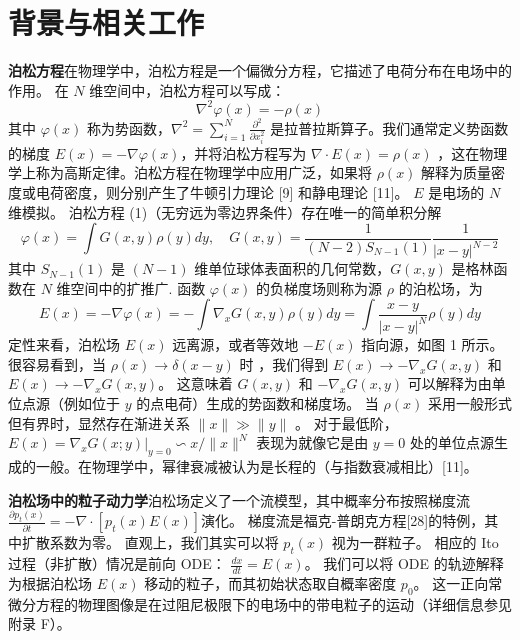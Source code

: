 \documentclass[hyperref,UTF-8]{ctexart}
\newcommand{\0}{\boldsymbol{0}}
\begin{document}
\section{背景与相关工作}

\textbf{泊松方程}\quad 在物理学中，泊松方程是一个偏微分方程，它描述了电荷分布在电场中的作用。 在 $N$ 维空间中，泊松方程可以写成：
\begin{equation}
    \nabla^2 \varphi(x) = -\rho (x)
\end{equation}
其中 $\varphi(x)$ 称为势函数，$\nabla^2  =\displaystyle \sum _{i=1}^N \frac{\partial ^2 }{\partial x_i ^2}$ 是拉普拉斯算子。我们通常定义势函数的梯度 $E(x) = -\nabla \varphi(x)$，并将泊松方程写为 $\nabla \cdot E(x) = \rho(x)$ ，这在物理学上称为高斯定律。泊松方程在物理学中应用广泛，如果将 $\rho(x)$ 解释为质量密度或电荷密度，则分别产生了牛顿引力理论 [9] 和静电理论 [11]。 $E$ 是电场的 $N$ 维模拟。 泊松方程 (1)（无穷远为零边界条件）存在唯一的简单积分解
\begin{equation}
    \varphi(x) = \int G(x,y)\rho(y) dy,\quad G(x,y) = \frac{1}{(N-2)S_{N-1}(1)} \frac{1}{|x-y|^{N-2}}
\end{equation}
其中 $S_{N-1}(1)$ 是 $(N - 1)$ 维单位球体表面积的几何常数，$G(x,y)$ 是格林函数在 $N$ 维空间中的扩推广. 函数 $\varphi(x)$ 的负梯度场则称为源 $\rho$ 的泊松场，为
\begin{equation}
    E(x) = -\nabla \varphi(x) = -\int \nabla_x G(x,y)\rho(y) dy = \int \frac{x-y}{|x-y|^N} \rho(y) dy
\end{equation}
定性来看，泊松场 $E(x)$ 远离源，或者等效地 $-E(x)$ 指向源，如图 1 所示。很容易看到，当 $ρ(x) → \delta(x - y)$ 时 ，我们得到 $E(x) \rightarrow -\nabla_x G(x,y)$ 和 $E(x) \rightarrow -\nabla_x G(x,y)$。 这意味着 $G(x,y)$ 和 $-\nabla_xG(x,y)$ 可以解释为由单位点源（例如位于 $y$ 的点电荷）生成的势函数和梯度场。 当 $\rho(x)$ 采用一般形式但有界时，显然存在渐进关系 $\|x\|\gg  \| y\|$ 。 对于最低阶，$E(x) = \nabla_xG(x;y)|_{y=0} \backsim x/\|x\|^N$ 表现为就像它是由 $y = 0$ 处的单位点源生成的一般。在物理学中，幂律衰减被认为是长程的（与指数衰减相比）[11]。

\textbf{泊松场中的粒子动力学}\quad 泊松场定义了一个流模型，其中概率分布按照梯度流$\displaystyle \frac{\partial p_t(x)}{\partial t} = -\nabla \cdot[p_t(x)E(x)]$演化。 梯度流是福克-普朗克方程[28]的特例，其中扩散系数为零。 直观上，我们其实可以将 $p_t(x)$ 视为一群粒子。 相应的 Ito 过程（非扩散）情况是前向 ODE： $\displaystyle \frac{d x}{dt} = E(x)$。 我们可以将 ODE 的轨迹解释为根据泊松场 $E(x)$ 移动的粒子，而其初始状态取自概率密度 $p_0$。 这一正向常微分方程的物理图像是在过阻尼极限下的电场中的带电粒子的运动（详细信息参见附录 F）。
\end{document}
